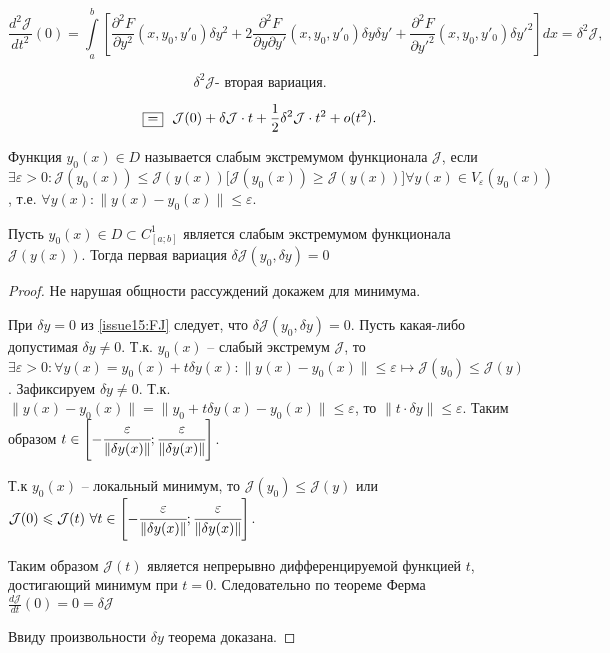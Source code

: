 \begin{equation} \label{issue15:SJ}
	\frac{d^2 \mathcal{J}}{dt^2}(0) = \int \limits_a^b \left[  \frac{\partial^2 F}{\partial y^2}(x, y_0, y'_0) \delta y^2 
	+ 2\frac{\partial^2 F}{\partial y \partial {y'}} (x, y_0, y'_0) \delta y \delta {y'} + \frac{\partial^2 F}{\partial {y'}^2} (x, y_0, y'_0) \delta {y'}^2  \right] dx 
	= \delta^2 \mathcal{J},
\end{equation}

\[ \delta^2 \mathcal{J} \text{- вторая вариация}. \]

\[ \fbox{=}~~ \mathcal{J}(0) + \delta \mathcal{J}\cdot t + \frac{1}{2} \delta^2 \mathcal{J} \cdot t^2 + o(t^2).\]

\begin{definition}
	Функция $y_0(x) \in D$ называется слабым экстремумом функционала $\mathcal{J}$, если $\exists \varepsilon > 0: \mathcal{J}(y_0(x)) \leqslant \mathcal{J}(y(x)) \big[ \mathcal{J}(y_0(x)) \geqslant \mathcal{J}(y(x)) \big] \forall y(x) \in V_{\varepsilon} (y_0(x))$, т.е. $\forall y(x): \| y(x) - y_0(x)\| \leqslant \varepsilon$.
\end{definition}

\begin{theorem}
	Пусть $y_0(x) \in D \subset C^1_{[a;b]}$ является слабым экстремумом функционала $\mathcal{J}(y(x))$. Тогда первая вариация $\delta \mathcal{J}(y_0, \delta y) = 0$ 
\end{theorem}
\begin{proof}
	Не нарушая общности рассуждений докажем для минимума.
	
	При $\delta y = 0$ из \eqref{issue15:FJ} следует, что $\delta \mathcal{J}(y_0, \delta y) = 0$. Пусть какая-либо допустимая $\delta y \neq 0$. Т.к. $y_0(x)$ -- слабый экстремум $\mathcal{J}$, то $\exists \varepsilon > 0: \forall y(x) = y_0(x) + t \delta y(x): \| y(x) - y_0(x) \| \leqslant \varepsilon \mapsto \mathcal{J}(y_0) \leqslant \mathcal{J}(y)$. 
	Зафиксируем $\delta y \neq 0$. Т.к. $\| y(x) - y_0(x) \| = \| y_0 + t \delta y(x) - y_0(x)\| \leqslant \varepsilon$, то $\| t \cdot \delta y \| \leqslant \varepsilon $. Таким образом $t \in \left[ - \cfrac{\varepsilon}{\| \delta y(x)\|}; \cfrac{\varepsilon}{\| \delta y(x)\|}\right]$.
	
	Т.к $y_0(x)$ -- локальный минимум, то $\mathcal{J}(y_0) \leqslant \mathcal{J}(y)$ или $\mathcal{J}(0) \leqslant \mathcal{J}(t)~\forall t \in \left[ - \cfrac{\varepsilon}{\| \delta y(x)\|}; \cfrac{\varepsilon}{\| \delta y(x)\|} \right]$.
	
	Таким образом $\mathcal{J}(t)$ является непрерывно дифференцируемой функцией $t$, достигающий минимум при $t = 0$. Следовательно по теореме Ферма $\frac{d \mathcal{J}}{dt} (0) = 0 = \delta \mathcal{J}$
	
	Ввиду произвольности $\delta y$ теорема доказана. 
\end{proof}

